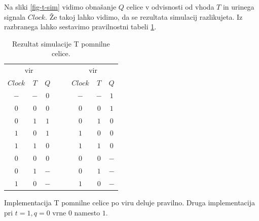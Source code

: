 \documentclass[a4paper, 11pt]{article}
\begin{document}
Na sliki \ref{fig-t-sim} vidimo obnašanje $Q$ celice v odvisnosti od vhoda $T$ in urinega signala $Clock$. Že takoj lahko vidimo, da se rezultata simulacij razlikujeta. Iz razbranega lahko sestavimo pravilnostni tabeli \ref{tab-t-sim}.
\begin{table}[h!]
	\centering
	\small
	\begin{tabular}{cc|cccc|c}
	\multicolumn{3}{c}{vir \cite{quantum_dot}} & $\quad$ & \multicolumn{3}{c}{vir \cite{a_novel_approach}}\\
	$Clock$ & $T$ & $Q$ && $Clock$ & $T$ & $Q$ \\
	\cline{1-3} \cline{5-7}
	$-$ & $-$ & $0$ && $-$ & $-$ & $1$\\
	$0$ & $0$ & $0$ && $0$ & $0$ & $1$\\
	$0$ & $1$ & $1$ && $0$ & $1$ & $0$\\
	$1$ & $0$ & $1$ && $1$ & $0$ & $0$\\
	\cline{1-3} \cline{5-7}
	$1$ & $1$ & $0$ && $1$ & $1$ & $0$\\
	$0$ & $0$ & $0$ && $0$ & $0$ & $-$\\
	$0$ & $1$ & $-$ && $0$ & $1$ & $-$\\
	$1$ & $0$ & $-$ && $1$ & $0$ & $-$\\
	\end{tabular}
	\caption{Rezultat simulacije T pomnilne celice.}
	\label{tab-t-sim}
\end{table}

Implementacija T pomnilne celice po viru \cite{quantum_dot} deluje pravilno. Druga implementacija pri $t=1,q=0$ vrne $0$ namesto $1$.
\end{document}
